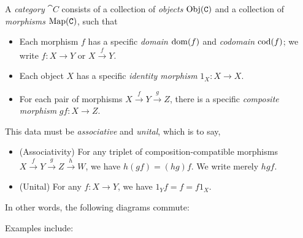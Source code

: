


\begin{dfn*}[Category]
	A \emph{category} $\cat{C}$ consists of a collection of \emph{objects} $\text{Obj}({\normalfont\texttt{C}})$
	and a collection of \emph{morphisms} $\text{Map}({\normalfont\texttt{C}})$, such that

	\begin{itemize}
		\item Each morphism $f$ has a specific \emph{domain} $\operatorname{dom}(f)$ and
		      \emph{codomain} $\operatorname{cod}(f)$; we write $f: X\rightarrow Y$ or
		      $X\xrightarrow{f} Y$.
		\item Each object $X$ has a specific \emph{identity morphism} $1_X:
			      X\rightarrow X$.
		\item For each pair of morphisms $X\xrightarrow{f} Y\xrightarrow{g}
			      Z$, there is a specific \emph{composite morphism} $gf:
			      X\rightarrow Z$.
	\end{itemize}
	This data must be \emph{associative} and \emph{unital}, which is to say,
	\begin{itemize}
		\item (Associativity) For any triplet of composition-compatible morphisms
		      $X\xrightarrow{f}Y \xrightarrow{g}Z\xrightarrow{h}W$, we have $h(gf) =
			      (hg)f$. We write merely $hgf$.
		\item (Unital) For any $f: X\rightarrow Y$, we have $1_Yf = f = f1_X$.
	\end{itemize}

	In other words, the following diagrams commute:

	\begin{figure}[H]
		\centering
		\begin{multicols}{2}

		\end{multicols}
	\end{figure}
\end{dfn*}

Examples include:


